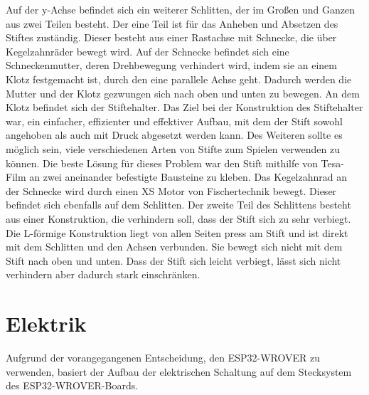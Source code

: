 \documentclass[conference,compsoc,final,a4paper]{IEEEtran}
\begin{document}
Auf der y-Achse befindet sich ein weiterer Schlitten, der im Großen und Ganzen aus zwei Teilen besteht. 
Der eine Teil ist für das Anheben und Absetzen des Stiftes zuständig. Dieser besteht aus einer Rastachse mit Schnecke, die über Kegelzahnräder bewegt wird. Auf der Schnecke befindet sich eine Schneckenmutter, deren Drehbewegung verhindert wird, indem sie an einem Klotz festgemacht ist, durch den eine parallele Achse geht. Dadurch werden die Mutter und der Klotz gezwungen sich nach oben und unten zu bewegen. An dem Klotz befindet sich der Stiftehalter. Das Ziel bei der Konstruktion des Stiftehalter war, ein einfacher, effizienter und effektiver Aufbau, mit dem der Stift sowohl angehoben als auch mit Druck abgesetzt werden kann. Des Weiteren sollte es möglich sein, viele verschiedenen Arten von Stifte zum Spielen verwenden zu können. Die beste Lösung für dieses Problem war den Stift mithilfe von Tesa-Film an zwei aneinander befestigte Bausteine zu kleben. 
Das Kegelzahnrad an der Schnecke wird durch einen XS Motor von Fischertechnik bewegt. Dieser befindet sich ebenfalls auf dem Schlitten.
Der zweite Teil des Schlittens besteht aus einer Konstruktion, die verhindern soll, dass der Stift sich zu sehr verbiegt. Die L-förmige Konstruktion liegt von allen Seiten press am Stift und ist direkt mit dem Schlitten und den Achsen verbunden. Sie bewegt sich nicht mit dem Stift nach oben und unten. Dass der Stift sich leicht verbiegt, lässt sich nicht verhindern aber dadurch stark einschränken.

\section{Elektrik}
Aufgrund der vorangegangenen Entscheidung, den ESP32-WROVER zu verwenden, basiert der Aufbau der elektrischen Schaltung auf dem Stecksystem des ESP32-WROVER-Boards.
\end{document}
